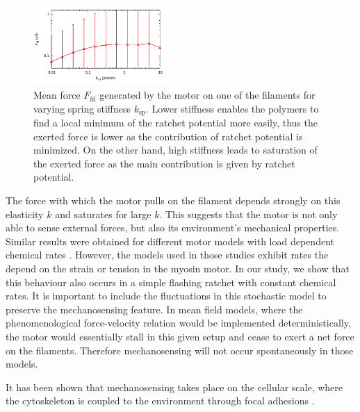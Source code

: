 \documentclass[aps,pre,twocolumn,showpacs,showkeys,superscriptaddress,floatfix]{revtex4-1}
\begin{document}
\begin{figure}[t]
\centering
\includegraphics[width=0.45\textwidth,height=!]{tug_k}
\caption{
\label{fig:tug_k}
Mean force $F_\text{fil}$ generated by the motor on one of the filaments for varying spring stiffness $k_\text{sp}$.
Lower stiffness enables the polymers to find a local minimum of the ratchet potential more easily, 
thus the exerted force is lower as the contribution of ratchet potential is minimized. 
On the other hand, high stiffness leads to saturation of the exerted force as the main contribution is given by ratchet potential. 
}
\end{figure}
The force with which the motor pulls on the filament depends strongly on this elasticity $k$ and saturates for large $k$. 
This suggests that the motor is not only able to sense external forces, but also its environment's mechanical properties.
Similar results were obtained for different motor models with load dependent chemical rates \cite{stam2015isoforms,albert2014stochastic}. 
However, the models used in those studies exhibit rates the depend on the strain or tension in the myosin motor. 
In our study, we show that this behaviour also occurs in a simple flashing ratchet with constant chemical rates. 
It is important to include the fluctuations in this stochastic model to preserve the mechanosensing feature. 
In mean field models, where the phenomenological force-velocity relation would be implemented deterministically, the motor would essentially stall in this given setup and cease to exert a net force on the filaments. 
Therefore mechanosensing will not occur spontaneously in those models.

It has been shown that mechanosensing takes place on the cellular scale, where the cytoskeleton is coupled to the environment through focal adhesions \cite{geiger2009environmental}.
\end{document}
